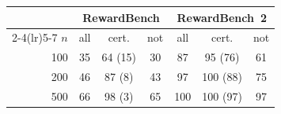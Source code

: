 \begin{tabular}{rcccccc}
\toprule
& \multicolumn{3}{c}{RewardBench} & \multicolumn{3}{c}{RewardBench~2}\\
\cmidrule(lr){2-4}\cmidrule(lr){5-7}
$n$ & all & cert. & not & all & cert. & not\\
\midrule
100 & 35 & 64 {\scriptsize(15)} & 30 & 87 & 95 {\scriptsize(76)} & 61\\
200 & 46 & 87 {\scriptsize(8)} & 43 & 97 & 100 {\scriptsize(88)} & 75\\
500 & 66 & 98 {\scriptsize(3)} & 65 & 100 & 100 {\scriptsize(97)} & 97\\
\bottomrule
\end{tabular}
